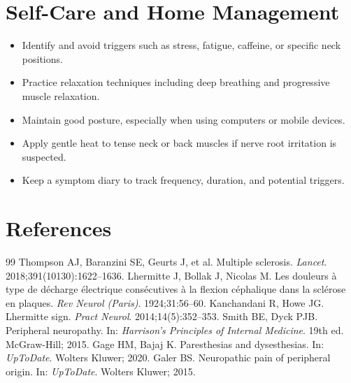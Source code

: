 \section*{Self-Care and Home Management}
\begin{itemize}
  \item Identify and avoid triggers such as stress, fatigue, caffeine, or specific neck positions.
  \item Practice relaxation techniques including deep breathing and progressive muscle relaxation.
  \item Maintain good posture, especially when using computers or mobile devices.
  \item Apply gentle heat to tense neck or back muscles if nerve root irritation is suspected.
  \item Keep a symptom diary to track frequency, duration, and potential triggers.
\end{itemize}

\section*{References}
\begin{thebibliography}{99}
Thompson AJ, Baranzini SE, Geurts J, et al. Multiple sclerosis. \textit{Lancet}. 2018;391(10130):1622--1636.
Lhermitte J, Bollak J, Nicolas M. Les douleurs \`{a} type de d\'{e}charge \'{e}lectrique cons\'{e}cutives \`{a} la flexion c\'{e}phalique dans la scl\'{e}rose en plaques. \textit{Rev Neurol (Paris)}. 1924;31:56--60.
Kanchandani R, Howe JG. Lhermitte sign. \textit{Pract Neurol}. 2014;14(5):352--353.
Smith BE, Dyck PJB. Peripheral neuropathy. In: \textit{Harrison's Principles of Internal Medicine}. 19th ed. McGraw-Hill; 2015.
Gage HM, Bajaj K. Paresthesias and dysesthesias. In: \textit{UpToDate}. Wolters Kluwer; 2020.
Galer BS. Neuropathic pain of peripheral origin. In: \textit{UpToDate}. Wolters Kluwer; 2015.
\end{thebibliography}
